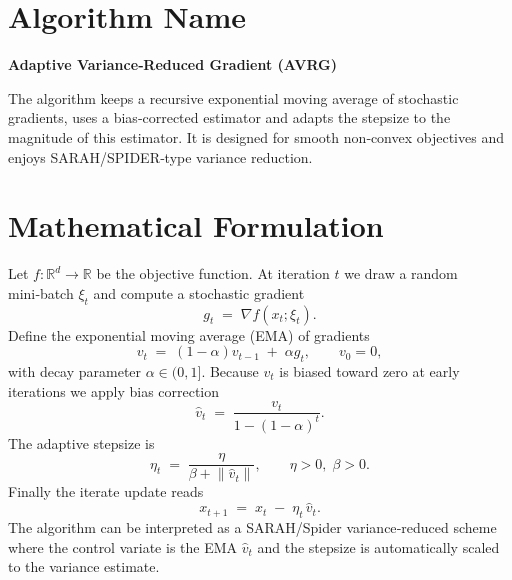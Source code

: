 \documentclass[11pt]{article}
\newcommand{\R}{\mathbb{R}}
\newcommand{\norm}[1]{\left\lVert#1\right\rVert}
\newcommand{\grad}{\nabla}
\begin{document}
\section*{Algorithm Name}
\textbf{Adaptive Variance‑Reduced Gradient (AVRG)}  

The algorithm keeps a recursive exponential moving average of stochastic gradients, uses a bias‑corrected estimator and adapts the stepsize to the magnitude of this estimator. It is designed for smooth non‑convex objectives and enjoys SARAH/SPIDER‑type variance reduction.

\section*{Mathematical Formulation}
Let $f:\R^{d}\rightarrow\R$ be the objective function. At iteration $t$ we draw a random mini‑batch $\xi_{t}$ and compute a stochastic gradient
\[
g_{t}\;=\;\grad f(x_{t};\xi_{t}) .
\]
Define the exponential moving average (EMA) of gradients
\begin{equation}
    v_{t}\;=\;(1-\alpha)v_{t-1}\;+\;\alpha g_{t},\qquad v_{0}=0,
    \label{eq:ema}
\end{equation}
with decay parameter $\alpha\in(0,1]$.  
Because $v_{t}$ is biased toward zero at early iterations we apply bias correction
\begin{equation}
    \hat v_{t}\;=\;\frac{v_{t}}{1-(1-\alpha)^{t}} .
    \label{eq:bias}
\end{equation}
The adaptive stepsize is
\begin{equation}
    \eta_{t}\;=\;\frac{\eta}{\beta+\norm{\hat v_{t}}},\qquad 
    \eta>0,\;\beta>0 .
    \label{eq:stepsize}
\end{equation}
Finally the iterate update reads
\begin{equation}
    x_{t+1}\;=\;x_{t}\;-\;\eta_{t}\,\hat v_{t}.
    \label{eq:update}
\end{equation}
The algorithm can be interpreted as a SARAH/Spider variance‑reduced scheme where the control variate is the EMA $\hat v_{t}$ and the stepsize is automatically scaled to the variance estimate.
\end{document}
